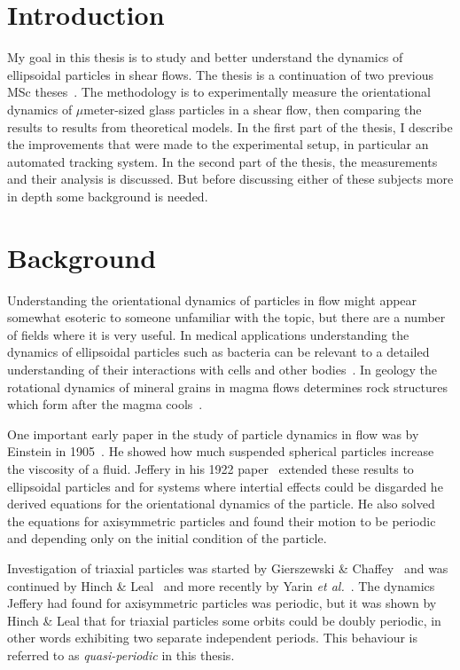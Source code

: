 \section{Introduction}
My goal in this thesis is to study and better understand the dynamics of ellipsoidal particles in shear flows. The thesis is a continuation of two previous MSc theses~\cite{AntonThesis, JonasThesis}. The methodology is to experimentally measure the orientational dynamics of $\mu$meter-sized glass particles in a shear flow, then comparing the results to results from theoretical models. In the first part of the thesis, I describe the improvements that were made to the experimental setup, in particular an automated tracking system. In the second part of the thesis, the measurements and their analysis is discussed. But before discussing either of these subjects more in depth some background is needed.

\section{Background}
Understanding the orientational dynamics of particles in flow might appear somewhat esoteric to someone unfamiliar with the topic, but there are a number of fields where it is very useful. In medical applications understanding the dynamics of ellipsoidal particles such as bacteria can be relevant to a detailed understanding of their interactions with cells and other bodies~\cite{Tolga}. In geology the rotational dynamics of mineral grains in magma flows determines rock structures which form after the magma cools~\cite{geology}.

One important early paper in the study of particle dynamics in flow was by Einstein in 1905~\cite{Einstein}. He showed how much suspended spherical particles increase the viscosity of a fluid. Jeffery in his 1922 paper~\cite{Jeffery} extended these results to ellipsoidal  particles and for systems where intertial effects could be disgarded he derived equations for the orientational dynamics of the particle. He also solved the equations for axisymmetric particles and found their motion to be periodic and depending only on the initial condition of the particle. 

Investigation of triaxial particles was started by Gierszewski \& Chaffey~\cite{Chaffey} and was continued by Hinch \& Leal~\cite{Leal} and more recently by Yarin \emph{et al.}~\cite{Yarin}. 
The dynamics Jeffery had found for axisymmetric particles was periodic, but it was shown by Hinch \& Leal that for triaxial particles some orbits could be doubly periodic, in other words exhibiting two separate independent periods. This behaviour is referred to as \emph{quasi-periodic} in this thesis.


